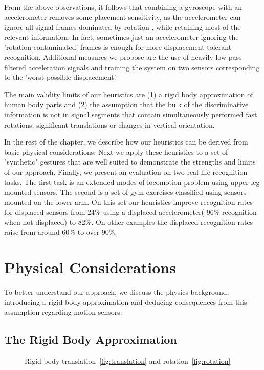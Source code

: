 From the above observations, it follows that combining a gyroscope with an
accelerometer removes some placement sensitivity, as the accelerometer can 
ignore all signal frames dominated by rotation , while retaining 
 most of the relevant information. In fact, sometimes just an accelerometer
ignoring the 'rotation-contaminated' frames is enough for
more displacement tolerant recognition. 
Additional measures we propose are the use of heavily low pass 
filtered acceleration signals and training the system on 
two sensors corresponding to the 'worst
possible displacement'.

The main validity limits of our heuristics are (1) a rigid
body approximation of human body parts and (2)
the assumption that the  bulk of the discriminative information is 
not in signal segments that contain simultaneously
performed fast rotations, significant translations or changes in
vertical orientation. 

In the rest of the chapter, we describe how our heuristics can
be  derived from  basic physical considerations. Next we apply these heuristics
to a set of "synthetic" gestures that are well suited to demonstrate
the strengths and limits of our approach. 
Finally, we present an evaluation on two real life
recognition tasks. The first task is an extended modes of locomotion
problem using upper leg mounted sensors. The second is a set of gym
exercises classified using sensors mounted on the lower arm.
On this set our heuristics improve recognition rates for displaced
sensors from 24\% using a displaced accelerometer( 96\% recognition
when not displaced) to 82\%. On other examples the displaced
recognition rates raise from around 60\% to over 90\%.

\section{Physical Considerations}
\label{sec:pyhsical}

To better understand our approach, 
we discuss the physics background, introducing 
a rigid body approximation and deducing consequences from this
assumption regarding motion sensors.

\subsection{The Rigid Body Approximation}
\label{sec:rigid}

\begin{figure}[t]
    \begin{center}
      \end{center}
\caption[Rigid body translation and rotation]{Rigid body translation~\ref{fig:translation} and rotation~\ref{fig:rotation}}
\label{fig:physics}
\vspace{-10pt}
\end{figure}

